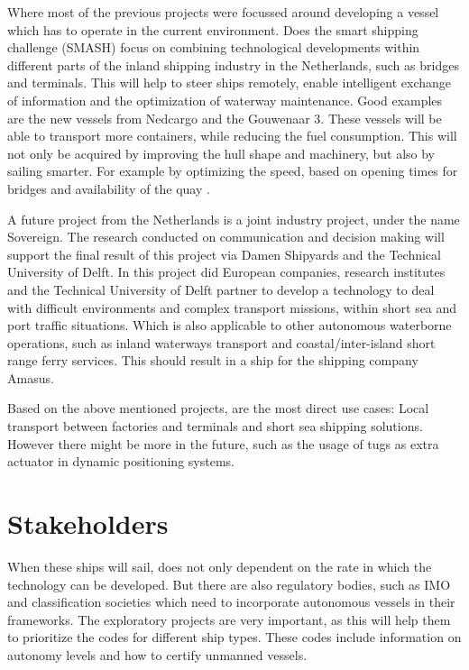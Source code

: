 Where most of the previous projects were focussed around developing a vessel which has to operate in the current environment. Does the smart shipping challenge (SMASH) focus on combining technological developments within different parts of the inland shipping industry in the Netherlands, such as bridges and terminals. This will help to steer ships remotely, enable intelligent exchange of information and the optimization of waterway maintenance.
Good examples are the new vessels from Nedcargo and the Gouwenaar 3. These vessels will be able to transport more containers, while reducing the fuel consumption. This will not only be acquired by improving the hull shape and machinery, but also by sailing smarter. For example by optimizing the speed, based on opening times for bridges and availability of the quay \cite{SMASH2017}. 

A future project from the Netherlands is a joint industry project, under the name Sovereign. The research conducted on communication and decision making will support the final result of this project via Damen Shipyards and the Technical University of Delft. In this project did European companies, research institutes and the Technical University of Delft partner to develop a technology to deal with difficult environments and complex transport missions, within short sea and port traffic situations. Which is also applicable to other autonomous waterborne operations, such as inland waterways transport and coastal/inter-island short range ferry services. This should result in a ship for the shipping company Amasus.

Based on the above mentioned projects, are the most direct use cases: Local transport between factories and terminals and short sea shipping solutions. However there might be more in the future, such as the usage of tugs as extra actuator in dynamic positioning systems.

\section{Stakeholders}
When these ships will sail, does not only dependent on the rate in which the technology can be developed. But there are also regulatory bodies, such as \ac{IMO} and classification societies which need to incorporate autonomous vessels in their frameworks. 
The exploratory projects are very important, as this will help them to prioritize the codes for different ship types. These codes include information on autonomy levels and how to certify unmanned vessels.

